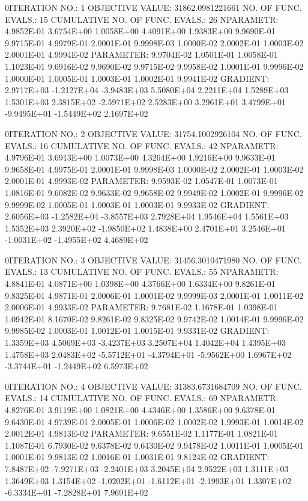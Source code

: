 \documentclass[
  letterpaper,
  toc=chapterentrywithdots,
  listof=totoc,
  11pt,
  headings=small,
  usegeometry]{scrreprt}
\begin{document}
\begin{nonmemlisting}
0ITERATION NO.:    1    OBJECTIVE VALUE:   31862.0981221661        NO. OF FUNC. EVALS.:  15
 CUMULATIVE NO. OF FUNC. EVALS.:       26
 NPARAMETR:  4.9852E-01  3.6754E+00  1.0058E+00  4.4091E+00  1.9383E+00  9.9690E-01  9.9715E-01  4.9979E-01  2.0001E-01  9.9998E-03
             1.0000E-02  2.0002E-01  1.0003E-02  2.0001E-01  4.9994E-02
 PARAMETER:  9.9704E-02  1.0501E-01  1.0058E-01  1.1023E-01  9.6916E-02  9.9690E-02  9.9715E-02  9.9958E-02  1.0001E-01  9.9996E-02
             1.0000E-01  1.0005E-01  1.0003E-01  1.0002E-01  9.9941E-02
 GRADIENT:   2.9717E+03 -1.2127E+04 -3.9483E+03  5.5080E+04  2.2211E+04  1.5289E+03  1.5301E+03  2.3815E+02 -2.5971E+02  2.5283E+00
             3.2961E+01  3.4799E+01 -9.9495E+01 -1.5449E+02  2.1697E+02

0ITERATION NO.:    2    OBJECTIVE VALUE:   31754.1002926104        NO. OF FUNC. EVALS.:  16
 CUMULATIVE NO. OF FUNC. EVALS.:       42
 NPARAMETR:  4.9796E-01  3.6913E+00  1.0073E+00  4.3264E+00  1.9216E+00  9.9633E-01  9.9658E-01  4.9975E-01  2.0001E-01  9.9998E-03
             1.0000E-02  2.0002E-01  1.0003E-02  2.0001E-01  4.9993E-02
 PARAMETER:  9.9593E-02  1.0547E-01  1.0073E-01  1.0816E-01  9.6082E-02  9.9633E-02  9.9658E-02  9.9949E-02  1.0002E-01  9.9996E-02
             9.9999E-02  1.0005E-01  1.0003E-01  1.0003E-01  9.9933E-02
 GRADIENT:   2.6056E+03 -1.2582E+04 -3.8557E+03  2.7928E+04  1.9546E+04  1.5561E+03  1.5352E+03  2.3920E+02 -1.9850E+02  1.4838E+00
             2.4701E+01  3.2546E+01 -1.0031E+02 -1.4955E+02  4.4689E+02

0ITERATION NO.:    3    OBJECTIVE VALUE:   31456.3010471980        NO. OF FUNC. EVALS.:  13
 CUMULATIVE NO. OF FUNC. EVALS.:       55
 NPARAMETR:  4.8841E-01  4.0871E+00  1.0398E+00  4.3766E+00  1.6334E+00  9.8261E-01  9.8325E-01  4.9871E-01  2.0006E-01  1.0001E-02
             9.9999E-03  2.0001E-01  1.0011E-02  2.0006E-01  4.9933E-02
 PARAMETER:  9.7681E-02  1.1678E-01  1.0398E-01  1.0942E-01  8.1670E-02  9.8261E-02  9.8325E-02  9.9742E-02  1.0014E-01  9.9996E-02
             9.9985E-02  1.0003E-01  1.0012E-01  1.0015E-01  9.9331E-02
 GRADIENT:   1.3359E+03  4.5069E+03 -3.4237E+03  3.2507E+04  1.4042E+04  1.4395E+03  1.4758E+03  2.0483E+02 -5.5712E+01 -4.3794E+01
            -5.9562E+00  1.6967E+02 -3.3744E+01 -1.2449E+02  6.5973E+02

0ITERATION NO.:    4    OBJECTIVE VALUE:   31383.6731684709        NO. OF FUNC. EVALS.:  14
 CUMULATIVE NO. OF FUNC. EVALS.:       69
 NPARAMETR:  4.8276E-01  3.9119E+00  1.0821E+00  4.4346E+00  1.3586E+00  9.6378E-01  9.6430E-01  4.9739E-01  2.0005E-01  1.0006E-02
             1.0002E-02  1.9993E-01  1.0014E-02  2.0012E-01  4.9813E-02
 PARAMETER:  9.6551E-02  1.1177E-01  1.0821E-01  1.1087E-01  6.7930E-02  9.6378E-02  9.6430E-02  9.9478E-02  1.0011E-01  1.0005E-01
             1.0001E-01  9.9813E-02  1.0016E-01  1.0031E-01  9.8124E-02
 GRADIENT:   7.8487E+02 -7.9271E+03 -2.2401E+03  3.2045E+04  2.9522E+03  1.3111E+03  1.3649E+03  1.3154E+02 -1.0202E+01 -1.6112E+01
            -2.1993E+01  1.3307E+02 -6.3334E+01 -7.2828E+01  7.9691E+02


\end{nonmemlisting}
\end{document}
